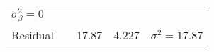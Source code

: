 \documentclass[12pt,]{article}
\begin{document}
\begin{longtable}[]{@{}lllll@{}}
\begin{minipage}[t]{0.28\columnwidth}
\(\sigma^2_{\beta}=0\)\strut
\end{minipage}\tabularnewline
\begin{minipage}[t]{0.25\columnwidth}\raggedright
Residual\strut
\end{minipage} & \begin{minipage}[t]{0.13\columnwidth}\raggedright
\strut
\end{minipage} & \begin{minipage}[t]{0.09\columnwidth}\raggedright
17.87\strut
\end{minipage} & \begin{minipage}[t]{0.09\columnwidth}\raggedright
4.227\strut
\end{minipage} & \begin{minipage}[t]{0.28\columnwidth}\raggedright
\(\sigma^2=17.87\)\strut
\end{minipage}\tabularnewline
\bottomrule
\end{longtable}
\end{document}
